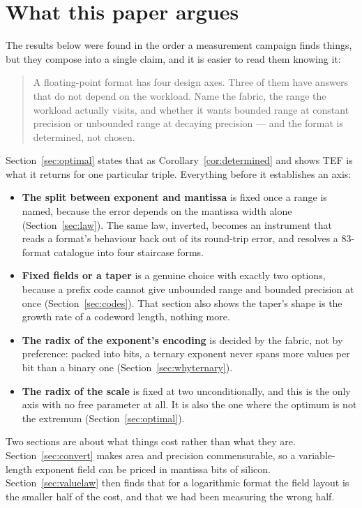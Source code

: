 \documentclass[11pt]{article}
\theoremstyle{definition}
\begin{document}
\section{What this paper argues}
\label{sec:roadmap}

The results below were found in the order a measurement campaign finds things,
but they compose into a single claim, and it is easier to read them knowing it:

\begin{quote}
A floating-point format has four design axes. Three of them have answers that do
not depend on the workload. Name the fabric, the range the workload actually
visits, and whether it wants bounded range at constant precision or unbounded
range at decaying precision --- and the format is determined, not chosen.
\end{quote}

Section~\ref{sec:optimal} states that as Corollary~\ref{cor:determined} and shows
TEF is what it returns for one particular triple. Everything before it establishes
an axis:

\begin{itemize}
\item \textbf{The split between exponent and mantissa} is fixed once a range is
named, because the error depends on the mantissa width alone
(Section~\ref{sec:law}). The same law, inverted, becomes an instrument that reads
a format's behaviour back out of its round-trip error, and resolves a
83-format catalogue into four staircase forms.
\item \textbf{Fixed fields or a taper} is a genuine choice with exactly two
options, because a prefix code cannot give unbounded range and bounded precision
at once (Section~\ref{sec:codes}). That section also shows the taper's shape is
the growth rate of a codeword length, nothing more.
\item \textbf{The radix of the exponent's encoding} is decided by the fabric, not
by preference: packed into bits, a ternary exponent never spans more values per
bit than a binary one (Section~\ref{sec:whyternary}).
\item \textbf{The radix of the scale} is fixed at two unconditionally, and this is
the only axis with no free parameter at all. It is also the one where the optimum
is not the extremum (Section~\ref{sec:optimal}).
\end{itemize}

Two sections are about what things cost rather than what they are.
Section~\ref{sec:convert} makes area and precision commensurable, so a
variable-length exponent field can be priced in mantissa bits of silicon.
Section~\ref{sec:valuelaw} then finds that for a logarithmic format the field
layout is the smaller half of the cost, and that we had been measuring the wrong
half.
\end{document}
